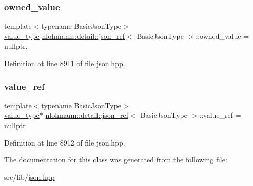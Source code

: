 \subsubsection{\texorpdfstring{owned\+\_\+value}{owned\_value}}
{\footnotesize\ttfamily template$<$typename Basic\+Json\+Type$>$ \\
\hyperlink{classnlohmann_1_1detail_1_1json__ref_a78d76cf288141049568c0d670ed670ef}{value\+\_\+type} \hyperlink{classnlohmann_1_1detail_1_1json__ref}{nlohmann\+::detail\+::json\+\_\+ref}$<$ Basic\+Json\+Type $>$\+::owned\+\_\+value = nullptr\hspace{0.3cm}{\ttfamily [mutable]}, {\ttfamily [private]}}



Definition at line 8911 of file json.\+hpp.

\mbox{\label{classnlohmann_1_1detail_1_1json__ref_a23504615c2076070d5e087443bb376a4}} 
\subsubsection{\texorpdfstring{value\+\_\+ref}{value\_ref}}
{\footnotesize\ttfamily template$<$typename Basic\+Json\+Type$>$ \\
\hyperlink{classnlohmann_1_1detail_1_1json__ref_a78d76cf288141049568c0d670ed670ef}{value\+\_\+type}$\ast$ \hyperlink{classnlohmann_1_1detail_1_1json__ref}{nlohmann\+::detail\+::json\+\_\+ref}$<$ Basic\+Json\+Type $>$\+::value\+\_\+ref = nullptr\hspace{0.3cm}{\ttfamily [private]}}



Definition at line 8912 of file json.\+hpp.



The documentation for this class was generated from the following file\+:\begin{DoxyCompactItemize}
\item 
src/lib/\hyperlink{json_8hpp}{json.\+hpp}\end{DoxyCompactItemize}
